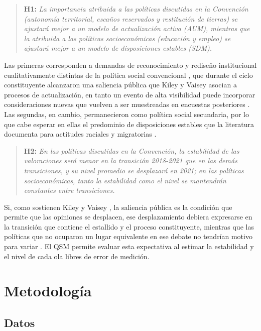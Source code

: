 \documentclass{article}
\begin{document}
\begin{quote}
\textbf{H1:} \textit{La importancia atribuida a las políticas discutidas en la Convención (autonomía territorial, escaños reservados y restitución de tierras) se ajustará mejor a un modelo de actualización activa (AUM), mientras que la atribuida a las políticas socioeconómicas (educación y empleo) se ajustará mejor a un modelo de disposiciones estables (SDM).}
\end{quote}

Las primeras corresponden a demandas de reconocimiento y rediseño institucional cualitativamente distintas de la política social convencional \parencite{bauer2016}, que durante el ciclo constituyente alcanzaron una saliencia pública que Kiley y Vaisey \parencite*{kiley2020} asocian a procesos de actualización, en tanto un evento de alta visibilidad puede incorporar consideraciones nuevas que vuelven a ser muestreadas en encuestas posteriores \parencite{zaller1992}. Las segundas, en cambio, permanecieron como política social secundaria, por lo que cabe esperar en ellas el predominio de disposiciones estables que la literatura documenta para actitudes raciales y migratorias \parencite{kustov2021,vaisey2021}.

\begin{quote}
\textbf{H2:} \textit{En las políticas discutidas en la Convención, la estabilidad de las valoraciones será menor en la transición 2018-2021 que en las demás transiciones, y su nivel promedio se desplazará en 2021; en las políticas socioeconómicas, tanto la estabilidad como el nivel se mantendrán constantes entre transiciones.}
\end{quote}

Si, como sostienen Kiley y Vaisey \parencite*{kiley2020}, la saliencia pública es la condición que permite que las opiniones se desplacen, ese desplazamiento debiera expresarse en la transición que contiene el estallido y el proceso constituyente, mientras que las políticas que no ocuparon un lugar equivalente en ese debate no tendrían motivo para variar \parencite{suarezdelucchi2024}. El QSM permite evaluar esta expectativa al estimar la estabilidad y el nivel de cada ola libres de error de medición.

\section{Metodología}

\subsection{Datos}
\end{document}
